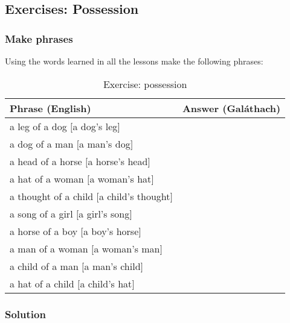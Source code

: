 \newpage
\subsection{Exercises: Possession}

\subsubsection{Make phrases}

Using the words learned in all the lessons make the following phrases:
\begin{table}[H]
\centering
\begin{tabular}{|l|M{10.0cm}|}
  \toprule
  \textbf{Phrase (English)} & \textbf{Answer (Gal\'{a}thach)}\\
  \toprule
  a leg of a dog $[$a dog's leg$]$ & \\
  \midrule
  a dog of a man $[$a man's dog$]$ & \\
  \midrule
  a head of a horse $[$a horse's head$]$ & \\
  \midrule
  a hat of a woman $[$a woman's hat$]$ & \\
  \midrule
  a thought of a child $[$a child's thought$]$ & \\
  \midrule
  a song of a girl $[$a girl's song$]$ & \\
  \midrule
  a horse of a boy $[$a boy's horse$]$ & \\
  \midrule
  a man of a woman $[$a woman's man$]$ & \\
  \midrule
  a child of a man $[$a man's child$]$ & \\
  \midrule
  a hat of a child $[$a child's hat$]$ & \\
  \bottomrule
\end{tabular}
\label{exercise_possession}
\caption{Exercise: possession}
\end{table}

\newpage
\subsubsection{Solution}

